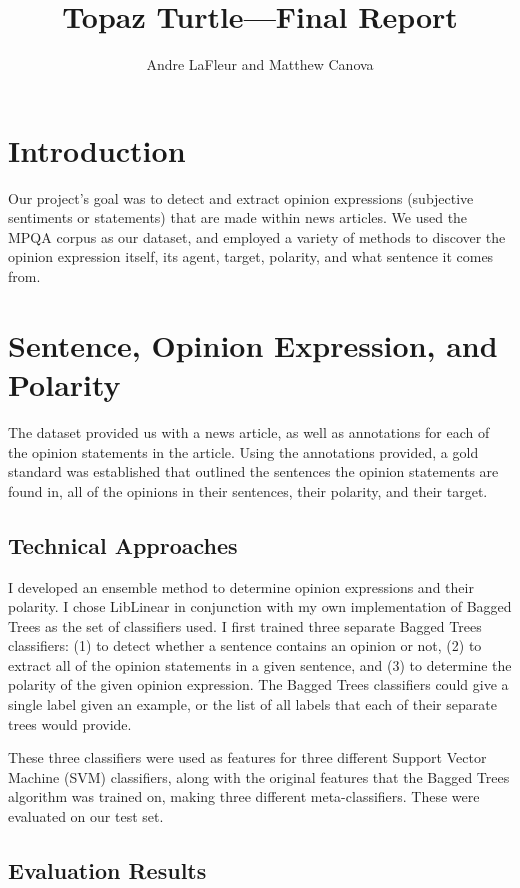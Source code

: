 \documentclass{article}
\title{Topaz Turtle---Final Report}
\author{Andre LaFleur and Matthew Canova}
\begin{document}
    \maketitle
    \section{Introduction}

    Our project's goal was to detect and extract opinion expressions (subjective sentiments or statements) that are made within news articles. We used the MPQA corpus as our dataset, and employed a variety of methods to discover the opinion expression itself, its agent, target, polarity, and what sentence it comes from.

    \section{Sentence, Opinion Expression, and Polarity}

    The dataset provided us with a news article, as well as annotations for each of the opinion statements in the article. Using the annotations provided, a gold standard was established that outlined the sentences the opinion statements are found in, all of the opinions in their sentences, their polarity, and their target.

    \subsection{Technical Approaches}


    I developed an ensemble method to determine opinion expressions and their polarity. I chose LibLinear in conjunction with my own implementation of Bagged Trees as the set of classifiers used. I first trained three separate Bagged Trees classifiers: (1) to detect whether a sentence contains an opinion or not, (2) to extract all of the opinion statements in a given sentence, and (3) to determine the polarity of the given opinion expression. The Bagged Trees classifiers could give a single label given an example, or the list of all labels that each of their separate trees would provide.

    These three classifiers were used as features for three different Support Vector Machine (SVM) classifiers, along with the original features that the Bagged Trees algorithm was trained on, making three different meta-classifiers. These were evaluated on our test set.

    \subsection{Evaluation Results}
\end{document}
